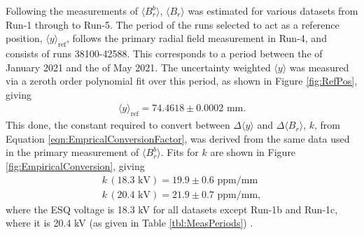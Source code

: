 Following the measurements of $\langle B_{r}^{b} \rangle$, $\langle B_{r} \rangle$ was estimated for various datasets from Run-1 through to Run-5. The period of the runs selected to act as a reference position, $\langle y \rangle_{\text{ref}}$, follows the primary radial field measurement in Run-4, and consists of runs 38100-42588. This corresponds to a period between the  of January 2021 and the  of May 2021. The uncertainty weighted $\langle y \rangle$ was measured via a zeroth order polynomial fit over this period, as shown in Figure \ref{fig:RefPos}, giving 
%
\begin{align*}
  \langle y \rangle_{\text{ref}} = 74.4618\pm0.0002\text{ mm.}
\end{align*} 
% 
%
This done, the constant required to convert between $\Delta \langle y \rangle$ and $\Delta \langle B_{r} \rangle$, $k$, from Equation \ref{eqn:EmpricalConversionFactor}, was derived from the same data used in the primary measurement of $\langle B_{r}^{b} \rangle$. Fits for $k$ are shown in Figure \ref{fig:EmpiricalConversion}, giving
%
\begin{align*}
    k\,(18.3 \text{ kV}) = 19.9\pm0.6 \text{ ppm/mm} \\
    k\,(20.4 \text{ kV}) = 21.9\pm0.7 \text{ ppm/mm},
\end{align*}
%
where the ESQ voltage is 18.3 kV for all datasets except Run-1b and Run-1c, where it is 20.4 kV (as given in Table \ref{tbl:MeasPeriods}) \cite{BeamDynamics}.


